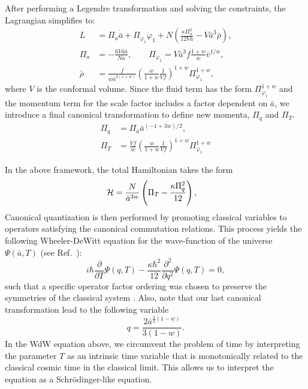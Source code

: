 \documentclass[a4paper,11pt]{article}
\newcommand{\dpar}[1]{\left(#1 \right)}
\begin{document}
{	After performing a Legendre transformation and solving the constraints, the Lagrangian
	simplifies to:
	\begin{align}
		L          & = \Pi_a \dot{\bar{a}} + \Pi_{\varphi_1} \dot{\varphi}_1 +
		N \left( \frac{\kappa \Pi_a^2}{12 V \bar{a}} - V \bar{a}^3 \bar{\rho} \right), \\
		\Pi_a      & = -\frac{6 V \bar{a} \dot{\bar{a}}}{N \kappa}, \qquad
		\Pi_{\varphi_1} = V \bar{a}^3 f \frac{1+w}{w}\bar{v}^{1/w},                    \\
		\bar{\rho} & = \frac{f}{w\bar{a}^{3(1+w)}} \left( \frac{w}{1+w}
		\frac{1}{Vf} \right)^{1+w}\Pi_{\varphi_1}^{1+w},
	\end{align}
	where $V$ is the conformal volume. Since the fluid term has the form
	$\Pi_{\varphi_1}^{1+w}$ and the momentum term for the scale factor includes a factor
	dependent on $\bar{a}$, we introduce a final canonical transformation to define new
	momenta, $\Pi_q$ and $\Pi_T$.
	\begin{align}
		\Pi_q & = \Pi_{\bar{a}} \bar{a}^{(-1+3w)/2},                                                 \\
		\Pi_T & = \frac{V f}{w} \left( \frac{w}{1+w} \frac{1}{Vf}\right)^{1+w} \Pi_{\varphi_1}^{1+w}
	\end{align}

	In the above framework, the total Hamiltonian takes the form
	\begin{align}
		\label{total_hamiltonian_FLRW}
		{\cal H} & = \frac{N}{\bar{a}^{3w}}\dpar{\Pi_{T}- \frac{\kappa\Pi_q^{2} }{12}} ,
	\end{align}
	Canonical quantization is then performed by promoting classical variables to operators
	satisfying the canonical commutation relations. This process yields the following
	Wheeler-DeWitt equation for the wave-function of the universe  $\Psi(\bar{a}, T)$
	(see Ref.~\cite{nelson_peter_bouncing_original}):
	\begin{equation}
		\label{wdweq}
		i\hbar\frac{\partial}{\partial T}\Psi(q,T) -
		\frac{\kappa\hbar^2}{12}\frac{\partial^{2}}{\partial q^{2}}\Psi(q,T)  = 0 ,
	\end{equation}
	such that a specific operator factor ordering was chosen to preserve the symmetries of
	the classical system \cite{halliwell1990introductory}. Also, note that our last
	canonical transformation lead to the following variable
	\begin{equation}
		q = \frac{2\bar{a}^{\frac{3}{2}\dpar{1-w} } }{ 3\dpar{1-w } }.
	\end{equation}
	In the WdW equation above, we circumvent the problem of time by interpreting the
	parameter $T$ as an intrinsic time variable that is monotonically related to the
	classical cosmic time in the classical limit. This allows us to interpret the equation
	as a Schrödinger-like equation.
}
\end{document}

